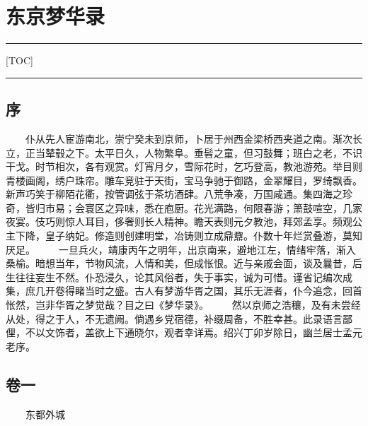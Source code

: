\hypertarget{ux4e1cux4eacux68a6ux534eux5f55}{%
\section{东京梦华录}\label{ux4e1cux4eacux68a6ux534eux5f55}}

\begin{center}\rule{0.5\linewidth}{\linethickness}\end{center}

{[}TOC{]}

\begin{center}\rule{0.5\linewidth}{\linethickness}\end{center}

\hypertarget{ux5e8f}{%
\subsection{序}\label{ux5e8f}}

　　仆从先人宦游南北，崇宁癸未到京师，卜居于州西金梁桥西夹道之南。渐次长立，正当辇毂之下。太平日久，人物繁阜。垂髫之童，但习鼓舞；班白之老，不识干戈。时节相次，各有观赏。灯宵月夕，雪际花时，乞巧登高，教池游苑。举目则青楼画阁，绣户珠帘。雕车竞驻于天街，宝马争驰于御路，金翠耀目，罗绮飘香。新声巧笑于柳陌花衢，按管调弦于茶坊酒肆。八荒争凑，万国咸通。集四海之珍奇，皆归市易；会寰区之异味，悉在庖厨。花光满路，何限春游；箫鼓喧空，几家夜宴。伎巧则惊人耳目，侈奢则长人精神。瞻天表则元夕教池，拜郊孟享。频观公主下降，皇子纳妃。修造则创建明堂，冶铸则立成鼎鼐。仆数十年烂赏叠游，莫知厌足。
　　一旦兵火，靖康丙午之明年，出京南来，避地江左，情绪牢落，渐入桑榆。暗想当年，节物风流，人情和美，但成怅恨。近与亲戚会面，谈及曩昔，后生往往妄生不然。仆恐浸久，论其风俗者，失于事实，诚为可惜。谨省记编次成集，庶几开卷得睹当时之盛。古人有梦游华胥之国，其乐无涯者，仆今追念，回首怅然，岂非华胥之梦觉哉？目之曰《梦华录》。
　　然以京师之浩穰，及有未尝经从处，得之于人，不无遗阙。倘遇乡党宿德，补缀周备，不胜幸甚。此录语言鄙俚，不以文饰者，盖欲上下通晓尔，观者幸详焉。绍兴丁卯岁除日，幽兰居士孟元老序。

\hypertarget{ux5377ux4e00}{%
\subsection{卷一}\label{ux5377ux4e00}}

　　东都外城


